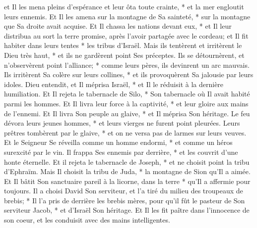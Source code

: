 et Il les mena pleins d'espérance et leur ôta toute crainte, * et la mer engloutit leurs ennemis.
Et Il les amena sur la montagne de Sa sainteté, * sur la montagne que Sa droite avait acquise. Et Il chassa les nations devant eux, * et Il leur distribua au sort la terre promise, après l'avoir partagée avec le cordeau;
et Il fit habiter dans leurs tentes * les tribus d'Israël.
Mais ils tentèrent et irritèrent le Dieu très haut, * et ils ne gardèrent point Ses préceptes.
Ils se détournèrent, et n'observèrent point l'alliance; * comme leurs pères, ils devinrent un arc mauvais.
Ils irritèrent Sa colère sur leurs collines, * et ils provoquèrent Sa jalousie par leurs idoles.
Dieu entendit, et Il méprisa Israël, * et Il le réduisit à la dernière humiliation.
Et Il rejeta le tabernacle de Silo, * Son tabernacle où Il avait habité parmi les hommes.
Et Il livra leur force à la captivité, * et leur gloire aux mains de l'ennemi.
Et Il livra Son peuple au glaive, * et Il méprisa Son héritage.
Le feu dévora leurs jeunes hommes, * et leurs vierges ne furent point pleurées.
Leurs prêtres tombèrent par le glaive, * et on ne versa pas de larmes sur leurs veuves.
Et le Seigneur Se réveilla comme un homme endormi, * et comme un héros surexcité par le vin.
Il frappa Ses ennemis par derrière, * et les couvrit d'une honte éternelle.
Et il rejeta le tabernacle de Joseph, * et ne choisit point la tribu d'Ephraïm.
Mais Il choisit la tribu de Juda, * la montagne de Sion qu'Il a aimée.
Et Il bâtit Son sanctuaire pareil à la licorne, dans la terre * qu'Il a affermie pour toujours.
Il a choisi David Son serviteur, et l'a tiré du milieu des troupeaux de brebis; * Il l'a pris de derrière les brebis mères,
pour qu'il fût le pasteur de Son serviteur Jacob, * et d'Israël Son héritage.
Et Il les fit paître dans l'innocence de son coeur, et les conduisit avec des mains intelligentes.

